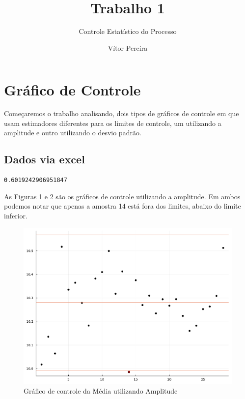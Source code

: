 \documentclass[
  letterpaper,
  DIV=11,
  numbers=noendperiod]{scrartcl}
\title{Trabalho 1}
\subtitle{Controle Estatístico do Processo}
\author{Vítor Pereira}
\date{}
\begin{document}
\maketitle
\ifdefined\Shaded\renewenvironment{Shaded}{\begin{tcolorbox}[breakable, frame hidden, enhanced, boxrule=0pt, borderline west={3pt}{0pt}{shadecolor}, interior hidden, sharp corners]}{\end{tcolorbox}}\fi

\section{Gráfico de Controle}

Começaremos o trabalho analisando, dois tipos de gráficos de controle em
que usam estimadores diferentes para os limites de controle, um
utilizando a amplitude e outro utilizando o desvio padrão.

\subsection{Dados via excel}

\begin{verbatim}
0.6019242906951847
\end{verbatim}

As Figuras 1 e 2 são os gráficos de controle utilizando a amplitude. Em
ambos podemos notar que apenas a amostra 14 está fora dos limites,
abaixo do limite inferior.

\begin{figure}

{\centering \includegraphics{trabalho1_files/figure-pdf/fig1-output-1.pdf}

}

\caption{Gráfico de controle da Média utilizando Amplitude}

\end{figure}
\end{document}
